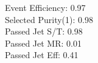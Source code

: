 Event Efficiency:   0.97\\ 
Selected Purity(1): 0.98\\ 
Passed Jet S/T:     0.98\\ 
Passed Jet MR:      0.01\\ 
Passed Jet Eff:     0.41